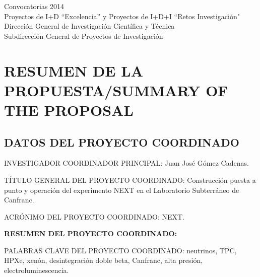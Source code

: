 \documentclass[a4paper,11pt,oneside]{article}
\begin{document}


\begin{center}
{\Large \textsf{Convocatorias 2014}} \\ \vspace{0.3cm}
{\Large  \textsf{Proyectos de I+D ``Excelencia'' y Proyectos de I+D+I ``Retos Investigación"}} \\ 
{\Large \textsf{Dirección General de Investigación Científica y Técnica}} \\
{\Large \textsf{Subdirección General de Proyectos de Investigación }} \\ 
\end{center}


\section{\bf \textsf{RESUMEN DE LA PROPUESTA/SUMMARY OF THE PROPOSAL}}
\subsection{\sc DATOS DEL PROYECTO COORDINADO}

{\sc INVESTIGADOR COORDINADOR PRINCIPAL:} Juan José Gómez Cadenas.
\vspace{0.3cm}

{\sc TÍTULO GENERAL DEL PROYECTO COORDINADO:} Construcción puesta a punto y operación del experimento NEXT en el Laboratorio Subterráneo de Canfranc.
\vspace{0.3cm}

{\sc ACRÓNIMO DEL PROYECTO COORDINADO:} NEXT.
\vspace{0.3cm}

{\bf RESUMEN DEL PROYECTO COORDINADO:} 
\vspace{0.3cm}

 
 \vspace{0.3cm}

{\sc PALABRAS CLAVE DEL PROYECTO COORDINADO:} neutrinos, TPC, HPXe, xenón, desintegración doble beta, Canfranc, alta presión, electroluminescencia. 
\end{document}
